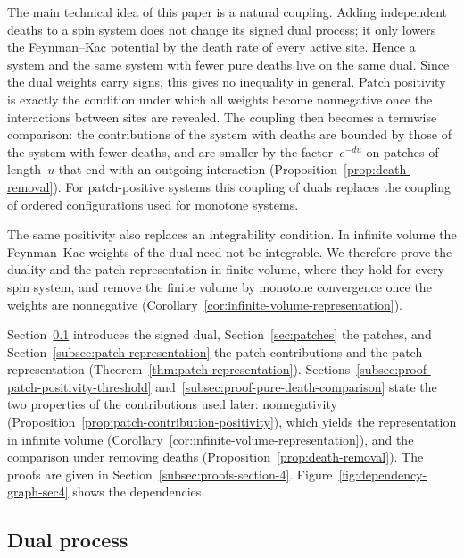 \documentclass[EJP,preprint,NODS,nobera]{ejpecp}
\newcommand{\chg}[1]{{\color{changegreen}#1}}
\begin{document}
\chg{The main technical idea of this paper is a natural coupling. Adding
independent deaths to a spin system does not change its signed dual process;
it only lowers the Feynman--Kac potential by the death rate of every active
site. Hence a system and the same system with fewer pure deaths live on the
same dual. Since the dual weights carry signs, this gives no inequality in
general. Patch positivity is exactly the condition under which all weights
become nonnegative once the interactions between sites are revealed. The
coupling then becomes a termwise comparison: the contributions of the system
with deaths are bounded by those of the system with fewer deaths, and are
smaller by the factor~$e^{-du}$ on patches of length~$u$ that end with an
outgoing interaction (Proposition~\ref{prop:death-removal}). For
patch-positive systems this coupling of duals replaces the coupling of
ordered configurations used for monotone systems.

The same positivity also replaces an integrability condition. In infinite
volume the Feynman--Kac weights of the dual need not be integrable. We
therefore prove the duality and the patch representation in finite volume,
where they hold for every spin system, and remove the finite volume by
monotone convergence once the weights are nonnegative
(Corollary~\ref{cor:infinite-volume-representation}).
}

\chg{Section~\ref{sec:dual} introduces the signed dual, Section~\ref{sec:patches}
the patches, and Section~\ref{subsec:patch-representation} the patch
contributions and the patch representation
(Theorem~\ref{thm:patch-representation}).
Sections~\ref{subsec:proof-patch-positivity-threshold}
and~\ref{subsec:proof-pure-death-comparison} state the two properties of the
contributions used later: nonnegativity
(Proposition~\ref{prop:patch-contribution-positivity}), which yields the
representation in infinite volume
(Corollary~\ref{cor:infinite-volume-representation}), and the comparison
under removing deaths (Proposition~\ref{prop:death-removal}). The proofs are
given in Section~\ref{subsec:proofs-section-4}.
Figure~\ref{fig:dependency-graph-sec4} shows the dependencies.}

\subsection{Dual process}
\label{sec:dual}
\end{document}
